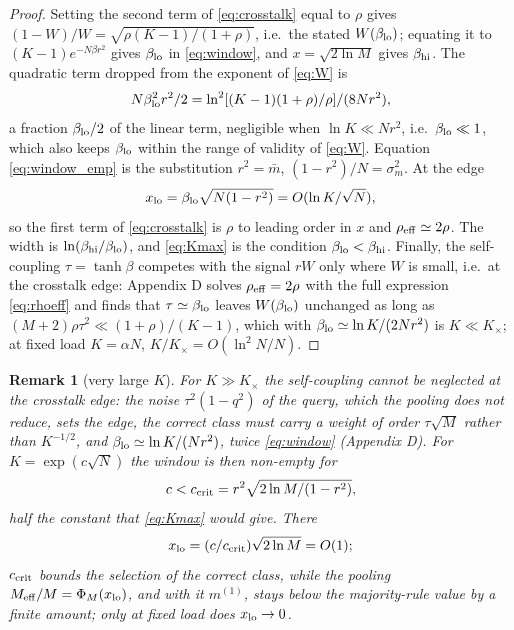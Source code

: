 \documentclass[11pt,a4paper]{article}
\newtheorem{remark}{Remark}
\newcommand{\Meff}{M_{\rm eff}}
\begin{document}
\begin{proof}
Setting the second term of \eqref{eq:crosstalk} equal to $\rho$ gives $(1-W)/W=\sqrt{\rho(K-1)/(1+\rho)}$, i.e.\ the stated $W(\beta_{\rm lo})$; equating it to $(K-1)e^{-N\beta r^2}$ gives $\beta_{\rm lo}$ in \eqref{eq:window}, and $x=\sqrt{2\ln M}$ gives $\beta_{\rm hi}$. The quadratic term dropped from the exponent of \eqref{eq:W} is
\begin{equation*}
N\beta_{\rm lo}^2r^2/2=\ln^2[(K-1)(1+\rho)/\rho]/(8Nr^2),
\end{equation*}
a fraction $\beta_{\rm lo}/2$ of the linear term, negligible when $\ln K\ll Nr^2$, i.e.\ $\beta_{\rm lo}\ll1$, which also keeps $\beta_{\rm lo}$ within the range of validity of \eqref{eq:W}. Equation \eqref{eq:window_emp} is the substitution $r^2=\bar m$, $(1-r^2)/N=\sigma_m^2$. At the edge
\begin{equation*}
x_{\rm lo}=\beta_{\rm lo}\sqrt{N(1-r^2)}=O(\ln K/\sqrt N),
\end{equation*}
so the first term of \eqref{eq:crosstalk} is $\rho$ to leading order in $x$ and $\rho_{\rm eff}\simeq2\rho$. The width is $\ln(\beta_{\rm hi}/\beta_{\rm lo})$, and \eqref{eq:Kmax} is the condition $\beta_{\rm lo}<\beta_{\rm hi}$. Finally, the self-coupling $\tau=\tanh\beta$ competes with the signal $rW$ only where $W$ is small, i.e.\ at the crosstalk edge: Appendix D solves $\rho_{\rm eff}=2\rho$ with the full expression \eqref{eq:rhoeff} and finds that $\tau\simeq\beta_{\rm lo}$ leaves $W(\beta_{\rm lo})$ unchanged as long as $(M+2)\rho\tau^2\ll(1+\rho)/(K-1)$, which with $\beta_{\rm lo}\simeq\ln K/(2Nr^2)$ is $K\ll K_\times$; at fixed load $K=\alpha N$, $K/K_\times=O(\ln^2N/N)$.
\end{proof}

\begin{remark}[very large $K$]\label{rem:largeK}
For $K\gg K_\times$ the self-coupling cannot be neglected at the crosstalk edge: the noise $\tau^2(1-q^2)$ of the query, which the pooling does not reduce, sets the edge, the correct class must carry a weight of order $\tau\sqrt M$ rather than $K^{-1/2}$, and $\beta_{\rm lo}\simeq\ln K/(Nr^2)$, twice \eqref{eq:window} (Appendix D). For $K=\exp(c\sqrt N)$ the window is then non-empty for
\begin{equation*}
c<c_{\rm crit}=r^2\sqrt{2\ln M/(1-r^2)},
\end{equation*}
half the constant that \eqref{eq:Kmax} would give. There
\begin{equation*}
x_{\rm lo}=(c/c_{\rm crit})\sqrt{2\ln M}=O(1);
\end{equation*}
$c_{\rm crit}$ bounds the selection of the correct class, while the pooling $\Meff/M=\Phi_M(x_{\rm lo})$, and with it $m^{(1)}$, stays below the majority-rule value by a finite amount; only at fixed load does $x_{\rm lo}\to0$.
\end{remark}
\end{document}
